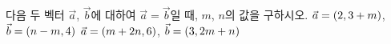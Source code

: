 다음 두 벡터 $\vec{a}$, $\vec{b}$에 대하여 $\vec{a}=\vec{b}$일 때, $m$, $n$의 값을 구하시오.
 $\vec{a}=(2{,}\mkern3mu\mathopen{}3+m)$, $\vec{b}=(n-m{,}\mkern3mu\mathopen{}4)$
 $\vec{a}=(m+2n{,}\mkern3mu\mathopen{}6)$, $\vec{b}=(3{,}\mkern3mu\mathopen{}2m+n)$
